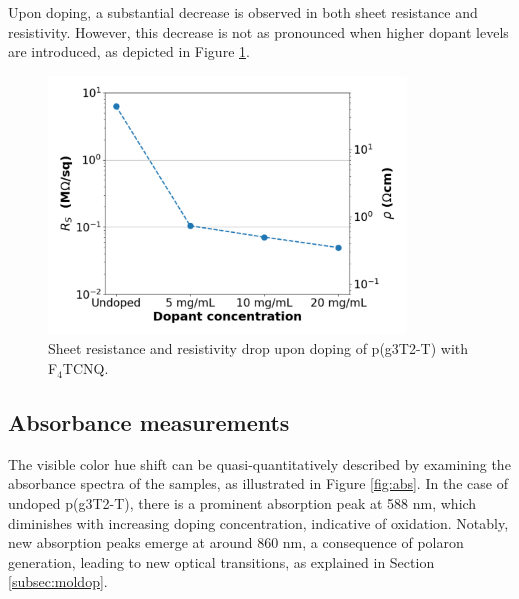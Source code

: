 Upon doping, a substantial decrease is observed in both sheet resistance and resistivity. However, this decrease is not as pronounced when higher dopant levels are introduced, as depicted in Figure \ref{fig:rho}. %

\begin{figure}[ht]
  \centering
  \includegraphics[width=9.5cm]{Images/pdf/resist.pdf}
  \caption[Sheet resistance and resistivity drop upon doping]{Sheet resistance and resistivity drop upon doping of p(g3T2-T) with F$_{4}$TCNQ. %
  }
  \label{fig:rho}
\end{figure}

\subsection{Absorbance measurements}
The visible color hue shift can be quasi-quantitatively described by examining the absorbance spectra of the samples, as illustrated in Figure \ref{fig:abs}. In the case of undoped p(g3T2-T), there is a prominent absorption peak at 588 nm, which diminishes with increasing doping concentration, indicative of oxidation. Notably, new absorption peaks emerge at around 860 nm, a consequence of polaron generation, leading to new optical transitions, as explained in Section \ref{subsec:moldop}. 

